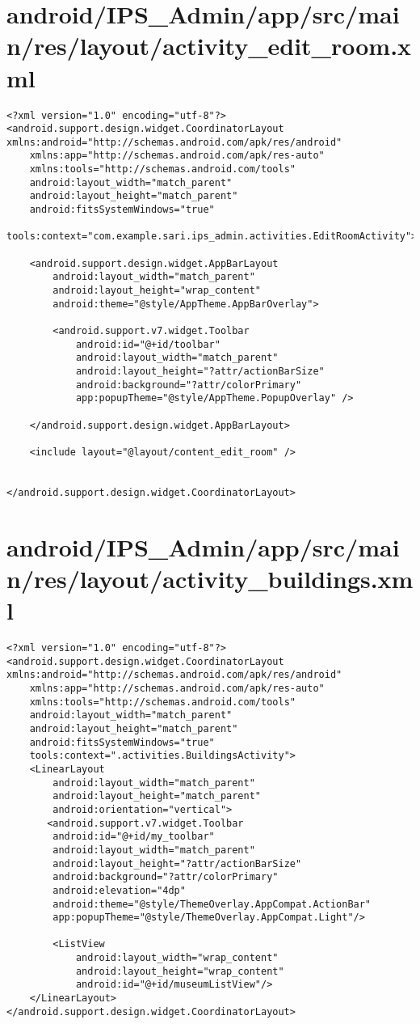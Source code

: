 \section{android/IPS\_Admin/app/src/main/res/layout/activity_edit_room.xml}
\begin{lstlisting}<?xml version="1.0" encoding="utf-8"?>
<android.support.design.widget.CoordinatorLayout xmlns:android="http://schemas.android.com/apk/res/android"
    xmlns:app="http://schemas.android.com/apk/res-auto"
    xmlns:tools="http://schemas.android.com/tools"
    android:layout_width="match_parent"
    android:layout_height="match_parent"
    android:fitsSystemWindows="true"
    tools:context="com.example.sari.ips_admin.activities.EditRoomActivity">

    <android.support.design.widget.AppBarLayout
        android:layout_width="match_parent"
        android:layout_height="wrap_content"
        android:theme="@style/AppTheme.AppBarOverlay">

        <android.support.v7.widget.Toolbar
            android:id="@+id/toolbar"
            android:layout_width="match_parent"
            android:layout_height="?attr/actionBarSize"
            android:background="?attr/colorPrimary"
            app:popupTheme="@style/AppTheme.PopupOverlay" />

    </android.support.design.widget.AppBarLayout>

    <include layout="@layout/content_edit_room" />


</android.support.design.widget.CoordinatorLayout>
\end{lstlisting}
\newpage
\section{android/IPS\_Admin/app/src/main/res/layout/activity_buildings.xml}
\begin{lstlisting}<?xml version="1.0" encoding="utf-8"?>
<android.support.design.widget.CoordinatorLayout xmlns:android="http://schemas.android.com/apk/res/android"
    xmlns:app="http://schemas.android.com/apk/res-auto"
    xmlns:tools="http://schemas.android.com/tools"
    android:layout_width="match_parent"
    android:layout_height="match_parent"
    android:fitsSystemWindows="true"
    tools:context=".activities.BuildingsActivity">
    <LinearLayout
        android:layout_width="match_parent"
        android:layout_height="match_parent"
        android:orientation="vertical">
       <android.support.v7.widget.Toolbar
        android:id="@+id/my_toolbar"
        android:layout_width="match_parent"
        android:layout_height="?attr/actionBarSize"
        android:background="?attr/colorPrimary"
        android:elevation="4dp"
        android:theme="@style/ThemeOverlay.AppCompat.ActionBar"
        app:popupTheme="@style/ThemeOverlay.AppCompat.Light"/>

        <ListView
            android:layout_width="wrap_content"
            android:layout_height="wrap_content"
            android:id="@+id/museumListView"/>
    </LinearLayout>
</android.support.design.widget.CoordinatorLayout>
\end{lstlisting}
\newpage

